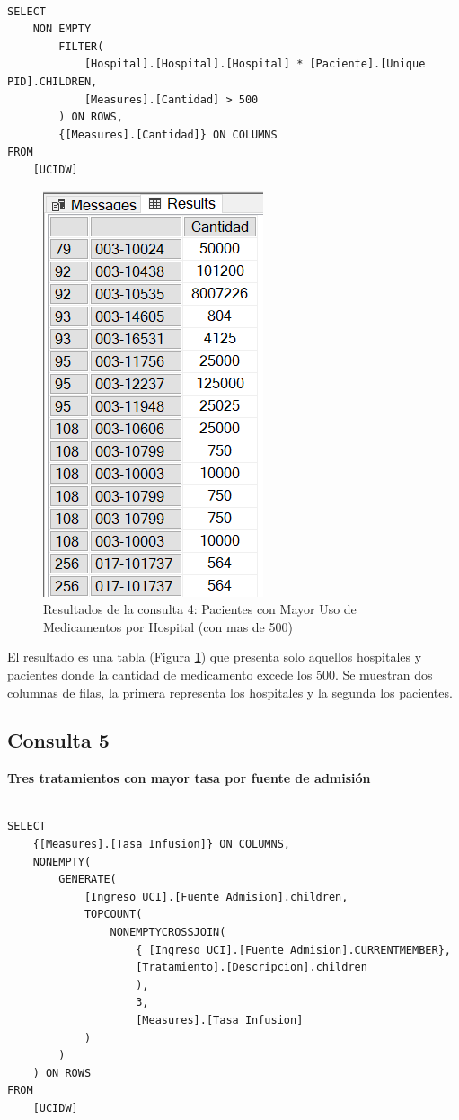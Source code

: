\documentclass{article}
\begin{document}
\begin{lstlisting}[style=ddlstyle, label=lst:consulta4,caption=Consulta 4: Pacientes con Mayor Uso de Medicamentos por Hospital (con mas de 500)]
	
SELECT 
	NON EMPTY 
		FILTER(
			[Hospital].[Hospital].[Hospital] * [Paciente].[Unique PID].CHILDREN,
			[Measures].[Cantidad] > 500
		) ON ROWS, 
		{[Measures].[Cantidad]} ON COLUMNS
FROM 
	[UCIDW]
\end{lstlisting}

\begin{figure}[H]
	\centering
	\includegraphics[width=0.3\linewidth]{images/consulta4.png}
	\caption{Resultados de la consulta 4: Pacientes con Mayor Uso de Medicamentos por Hospital (con mas de 500)}
	\label{fig:consulta4}
\end{figure}

El resultado es una tabla (Figura \ref{fig:consulta4}) que presenta solo aquellos hospitales y pacientes donde la cantidad de medicamento excede los 500. Se muestran dos columnas de filas, la primera representa los hospitales y la segunda los pacientes.

\subsection{Consulta 5}

\textbf{Tres tratamientos con mayor tasa por fuente de admisión}

\begin{lstlisting}[style=ddlstyle, label=lst:consulta5,caption=Consulta 5: Tres tratamientos con mayor tasa por fuente de admisión]
	
SELECT 
	{[Measures].[Tasa Infusion]} ON COLUMNS, 
	NONEMPTY(
		GENERATE(
			[Ingreso UCI].[Fuente Admision].children, 
			TOPCOUNT(
				NONEMPTYCROSSJOIN(
					{ [Ingreso UCI].[Fuente Admision].CURRENTMEMBER}, 
					[Tratamiento].[Descripcion].children
					), 
					3, 
					[Measures].[Tasa Infusion]
			)
		)
	) ON ROWS
FROM 
	[UCIDW]
\end{lstlisting}
\end{document}
